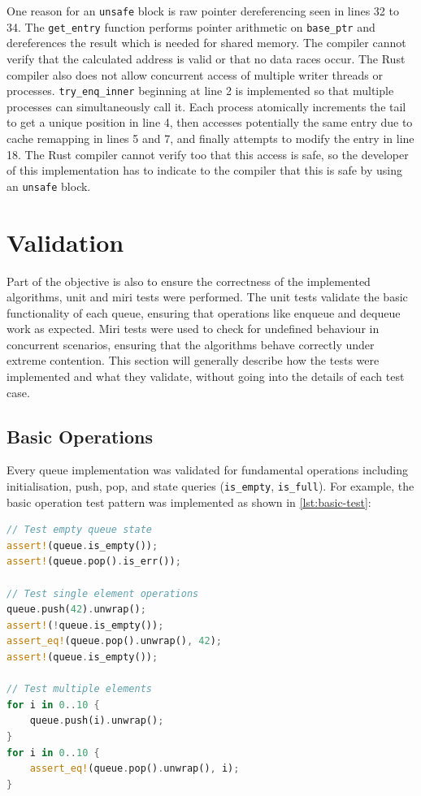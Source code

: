 One reason for an \texttt{unsafe} block is raw pointer dereferencing seen in lines 32 to 34. The \texttt{get\_entry} function performs pointer arithmetic on \texttt{base\_ptr} and dereferences the result which is needed for shared memory. The compiler cannot verify that the calculated address is valid or that no data races occur. The Rust compiler also does not allow concurrent access of multiple writer threads or processes. \texttt{try\_enq\_inner} beginning at line 2 is implemented so that multiple processes can simultaneously call it. Each process atomically increments the tail to get a unique position in line 4, then accesses potentially the same entry due to cache remapping in lines 5 and 7, and finally attempts to modify the entry in line 18. The Rust compiler cannot verify too that this access is safe, so the developer of this implementation has to indicate to the compiler that this is safe by using an \texttt{unsafe} block.

\section{Validation}
Part of the objective is also to ensure the correctness of the implemented algorithms, unit and miri tests were performed. The unit tests validate the basic functionality of each queue, ensuring that operations like enqueue and dequeue work as expected. Miri tests were used to check for undefined behaviour in concurrent scenarios, ensuring that the algorithms behave correctly under extreme contention. This section will generally describe how the tests were implemented and what they validate, without going into the details of each test case.

\subsection{Basic Operations}
Every queue implementation was validated for fundamental operations including initialisation, push, pop, and state queries (\texttt{is\_empty}, \texttt{is\_full}). For example, the basic operation test pattern was implemented as shown in \cref{lst:basic-test}:

\begin{lstlisting}[language=Rust, style=boxed, caption={Basic operation test pattern}, label={lst:basic-test}]
// Test empty queue state
assert!(queue.is_empty());
assert!(queue.pop().is_err());

// Test single element operations
queue.push(42).unwrap();
assert!(!queue.is_empty());
assert_eq!(queue.pop().unwrap(), 42);
assert!(queue.is_empty());

// Test multiple elements
for i in 0..10 {
    queue.push(i).unwrap();
}
for i in 0..10 {
    assert_eq!(queue.pop().unwrap(), i);
}
\end{lstlisting}

